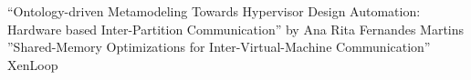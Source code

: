 “Ontology-driven Metamodeling Towards Hypervisor Design Automation: Hardware based Inter-Partition Communication” by Ana Rita Fernandes Martins\\
\indent ”Shared-Memory Optimizations for Inter-Virtual-Machine Communication”\\
\indent XenLoop \cite{Nastide2010}\\
